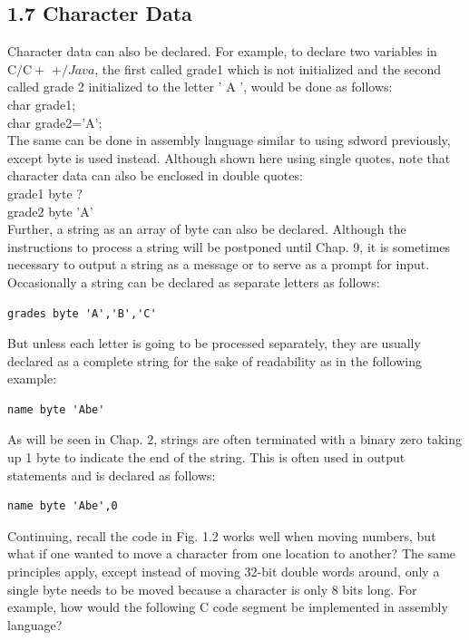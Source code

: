 \documentclass[10pt]{article}
\begin{document}
\subsection*{1.7 Character Data}
Character data can also be declared. For example, to declare two variables in $\mathrm{C} / \mathrm{C}+$ $+/ J a v a$, the first called grade1 which is not initialized and the second called grade 2 initialized to the letter ' A ', would be done as follows:\\
char grade1;\\
char grade2='A';\\
The same can be done in assembly language similar to using sdword previously, except byte is used instead. Although shown here using single quotes, note that character data can also be enclosed in double quotes:\\
grade1 byte ?\\
grade2 byte 'A'\\
Further, a string as an array of byte can also be declared. Although the instructions to process a string will be postponed until Chap. 9, it is sometimes necessary to output a string as a message or to serve as a prompt for input. Occasionally a string can be declared as separate letters as follows:

\begin{verbatim}
grades byte 'A','B','C'
\end{verbatim}

But unless each letter is going to be processed separately, they are usually declared as a complete string for the sake of readability as in the following example:

\begin{verbatim}
name byte 'Abe'
\end{verbatim}

As will be seen in Chap. 2, strings are often terminated with a binary zero taking up 1 byte to indicate the end of the string. This is often used in output statements and is declared as follows:

\begin{verbatim}
name byte 'Abe',0
\end{verbatim}

Continuing, recall the code in Fig. 1.2 works well when moving numbers, but what if one wanted to move a character from one location to another? The same principles apply, except instead of moving 32-bit double words around, only a single byte needs to be moved because a character is only 8 bits long. For example, how would the following C code segment be implemented in assembly language?
\end{document}
